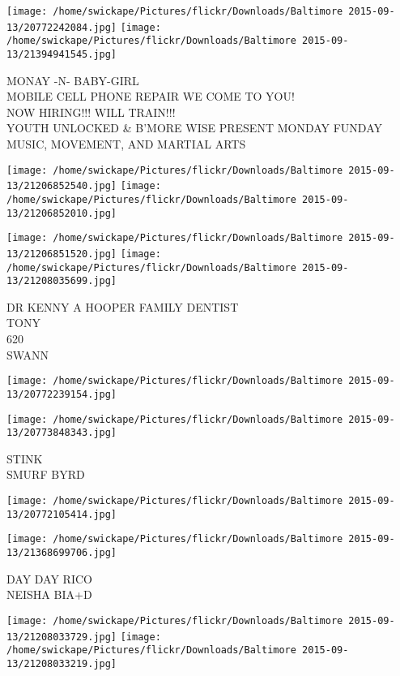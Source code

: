 \documentclass[10pt,letterpaper]{article}
\begin{document}
\texttt{[image: /home/swickape/Pictures/flickr/Downloads/Baltimore 2015-09-13/20772242084.jpg]}
\texttt{[image: /home/swickape/Pictures/flickr/Downloads/Baltimore 2015-09-13/21394941545.jpg]}

MONAY {-}N{-} BABY{-}GIRL\\
MOBILE CELL PHONE REPAIR WE COME TO YOU!\\
NOW HIRING!!! WILL TRAIN!!!\\
YOUTH UNLOCKED \& B'MORE WISE PRESENT MONDAY FUNDAY MUSIC, MOVEMENT, AND MARTIAL ARTS\\
\pagebreak

\texttt{[image: /home/swickape/Pictures/flickr/Downloads/Baltimore 2015-09-13/21206852540.jpg]}
\texttt{[image: /home/swickape/Pictures/flickr/Downloads/Baltimore 2015-09-13/21206852010.jpg]}

\texttt{[image: /home/swickape/Pictures/flickr/Downloads/Baltimore 2015-09-13/21206851520.jpg]}
\texttt{[image: /home/swickape/Pictures/flickr/Downloads/Baltimore 2015-09-13/21208035699.jpg]}

DR KENNY A HOOPER FAMILY DENTIST\\
TONY\\
620\\
SWANN\\
\pagebreak

\texttt{[image: /home/swickape/Pictures/flickr/Downloads/Baltimore 2015-09-13/20772239154.jpg]}

\vspace{0.25in}
\texttt{[image: /home/swickape/Pictures/flickr/Downloads/Baltimore 2015-09-13/20773848343.jpg]}

STINK\\
SMURF BYRD\\
\pagebreak

\texttt{[image: /home/swickape/Pictures/flickr/Downloads/Baltimore 2015-09-13/20772105414.jpg]}

\vspace{0.25in}
\texttt{[image: /home/swickape/Pictures/flickr/Downloads/Baltimore 2015-09-13/21368699706.jpg]}

DAY DAY RICO\\
NEISHA BIA+D\\
\pagebreak

\texttt{[image: /home/swickape/Pictures/flickr/Downloads/Baltimore 2015-09-13/21208033729.jpg]}
\texttt{[image: /home/swickape/Pictures/flickr/Downloads/Baltimore 2015-09-13/21208033219.jpg]}
\end{document}
